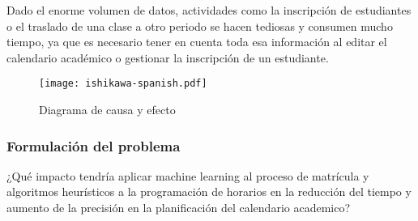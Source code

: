 Dado el enorme volumen de datos, actividades como la inscripción de estudiantes o el traslado de una clase a otro periodo se hacen tediosas y consumen mucho tiempo, ya que es necesario tener en cuenta toda esa información al editar el calendario académico o gestionar la inscripción de un estudiante.

\begin{figure}[H]
    \centering
    \caption{Diagrama de causa y efecto} \label{fig:ishikawa}
    \texttt{[image: ishikawa-spanish.pdf]}
\end{figure}

\subsubsection{Formulación del problema}
¿Qué impacto tendría aplicar machine learning al proceso de matrícula y algoritmos heurísticos a la programación de horarios en la reducción del tiempo y aumento de la precisión en la planificación del calendario academico?
